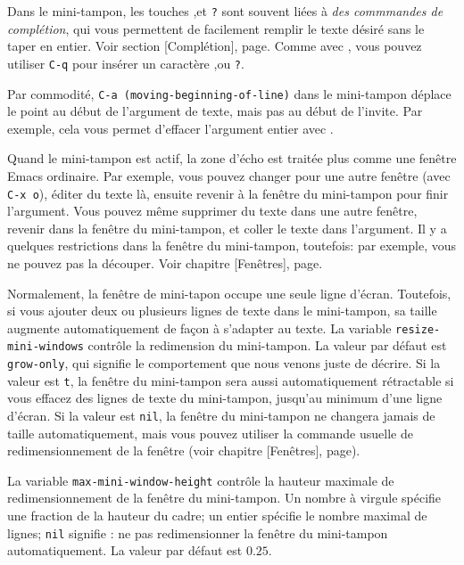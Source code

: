 Dans le mini-tampon, les touches \TAB,\SPC et \texttt{?} sont
souvent liées à \emph{des commmandes de complétion}, qui vous
permettent de facilement remplir le texte désiré sans le taper en
entier. Voir section [Complétion], page. Comme
avec \RET, vous pouvez utiliser \texttt{C-q} pour insérer un caractère
\TAB,\SPC ou \texttt{?}.\par

Par commodité, \texttt{C-a (moving-beginning-of-line)} dans le
mini-tampon déplace le point au début de l'argument de texte, mais pas
au début de l'invite. Par exemple, cela vous permet d'effacer
l'argument entier avec .\par

Quand le mini-tampon est actif, la zone d'écho est traitée plus comme
une fenêtre Emacs ordinaire. Par exemple, vous pouvez changer pour une
autre fenêtre (avec \texttt{C-x o}), éditer du texte là, ensuite
revenir à la fenêtre du mini-tampon pour finir l'argument. Vous pouvez
même supprimer du texte dans une autre fenêtre, revenir dans la
fenêtre du mini-tampon, et coller le texte dans l'argument. Il y a
quelques restrictions dans la fenêtre du mini-tampon, toutefois: par
exemple, vous ne pouvez pas la découper. Voir chapitre
[Fenêtres], page.\par

Normalement, la fenêtre de mini-tapon occupe une seule ligne
d'écran. Toutefois, si vous ajouter deux ou plusieurs lignes de texte
dans le mini-tampon, sa taille augmente automatiquement de façon à
s'adapter au texte. La variable \texttt{resize-mini-windows} contrôle
la redimension du mini-tampon. La valeur par défaut est
\texttt{grow-only}, qui signifie le comportement que nous venons juste
de décrire. Si la valeur est \texttt{t}, la fenêtre du mini-tampon
sera aussi automatiquement rétractable si vous effacez des lignes de
texte du mini-tampon, jusqu'au minimum d'une ligne d'écran. Si la
valeur est \texttt{nil}, la fenêtre du mini-tampon ne changera jamais
de taille automatiquement, mais vous pouvez utiliser la commande
usuelle de redimensionnement de la fenêtre (voir chapitre
[Fenêtres], page). \par

La variable \texttt{max-mini-window-height} contrôle la hauteur
maximale de redimensionnement de la fenêtre du mini-tampon. Un nombre
à virgule spécifie une fraction de la hauteur du cadre; un entier
spécifie le nombre maximal de lignes; \texttt{nil} signifie : ne pas
redimensionner la fenêtre du mini-tampon automatiquement. La valeur
par défaut est $0.25$.\par 

